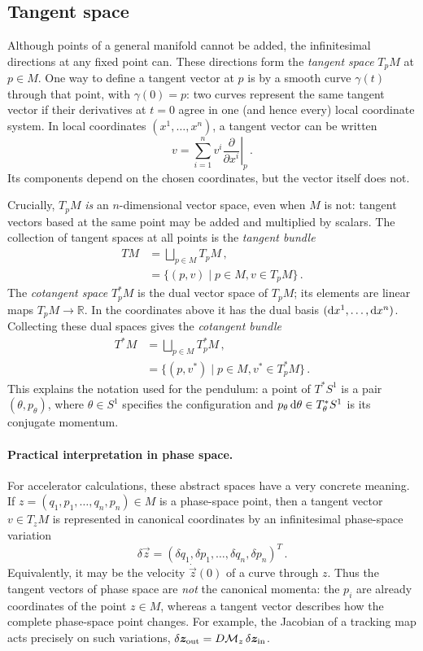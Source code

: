 \subsection{Tangent space}
Although points of a general manifold cannot be added, the infinitesimal
directions at any fixed point can.  These directions form the \emph{tangent
space} $T_p M$ at $p\in M$.  One way to define a tangent vector at $p$ is by
a smooth curve $\gamma(t)$ through that point, with $\gamma(0) = p$: two curves
represent the same tangent vector if their derivatives at $t = 0$ agree in one
(and hence every) local coordinate system.  In local coordinates
$(x^1,\ldots,x^n)$, a tangent vector can be written
\begin{equation}
    v = \sum_{i = 1}^n v^i\left.\frac{\partial}{\partial x^i}\right|_p\,.
\end{equation}
Its components depend on the chosen coordinates, but the vector itself does
not.

Crucially, $T_p M$ \emph{is} an $n$-dimensional vector space, even when $M$
is not: tangent vectors based at the same point may be added and multiplied
by scalars.  The collection of tangent spaces at all points is the
\emph{tangent bundle}
\begin{align}
    T M & = \bigsqcup_{p\in M} T_p M\,, \\
    & = \{(p, v) \mid p \in M, v \in T_p M\}\,.
\end{align}
The \emph{cotangent space} $T_p^* M$ is the dual vector space of $T_p M$; its
elements are linear maps $T_p M\to\mathbb{R}$.  In the coordinates above it
has the dual basis $(\dee x^1,\ldots,\dee x^n)$.  Collecting these dual spaces
gives the \emph{cotangent bundle}
\begin{align}
    T^* M & = \bigsqcup_{p\in M} T_p^* M\,, \\
    & = \{(p, v^*) \mid p \in M, v^* \in T_p^* M\}\,.
\end{align}
This explains the notation used for the pendulum: a point of $T^*S^1$ is a
pair $(\theta,p_\theta)$, where $\theta\in S^1$ specifies the configuration
and $p_\theta\,\dee\theta\in T_\theta^*S^1$ is its conjugate momentum.
\paragraph{Practical interpretation in phase space.}
For accelerator calculations, these abstract spaces have a very concrete
meaning.  If $z = (q_1,p_1,\ldots,q_n,p_n)\in M$ is a phase-space point, then a
tangent vector $v\in T_zM$ is represented in canonical coordinates by an
infinitesimal phase-space variation
\begin{equation}
    \delta\vec z = (\delta q_1,\delta p_1,\ldots,
    \delta q_n,\delta p_n)^T\,.
\end{equation}
Equivalently, it may be the velocity $\dot{\vec z}(0)$ of a curve through
$z$.  Thus the tangent vectors of phase space are \emph{not} the canonical
momenta: the $p_i$ are already coordinates of the point $z\in M$, whereas a
tangent vector describes how the complete phase-space point changes.  For
example, the Jacobian of a tracking map acts precisely on such variations,
$\delta\vec z_{\rm out} = D\mathcal M_z\,\delta\vec z_{\rm in}$.

